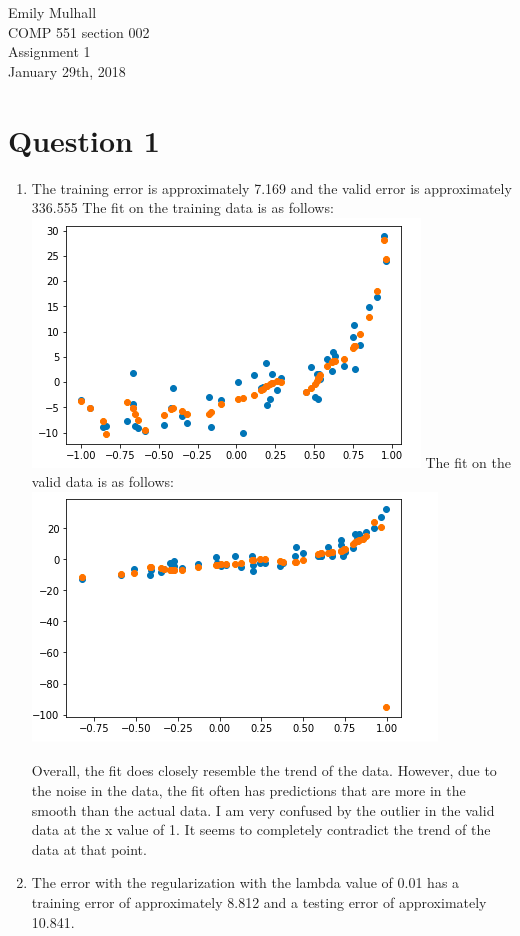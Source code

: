 \documentclass{article}
\begin{document}
\noindent Emily Mulhall\\
COMP 551 section 002\\
Assignment 1\\
January 29th, 2018\\

\section*{Question 1}
\begin{enumerate}
\item The training error is approximately 7.169 and the valid error is approximately 336.555
The fit on the training data is as follows:\\
\includegraphics{trainerr1}
The fit on the valid data is as follows:\\
\includegraphics{validerr1}

Overall, the fit does closely resemble the trend of the data.  However, due to the noise in the data, the fit often has predictions that are more in the smooth than the actual data.  I am very confused by the outlier in the valid data at the x value of 1.  It seems to completely contradict the trend of the data at that point.

\item The error with the regularization with the lambda value of 0.01 has a training error of approximately 8.812 and a testing error of approximately 10.841.\\


\end{enumerate}
\end{document}
